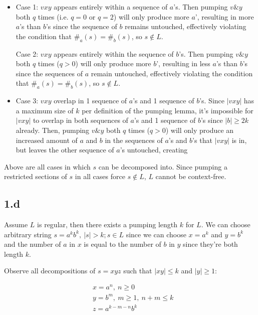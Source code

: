 \documentclass{article}
\begin{document}
\begin{itemize}

\item Case 1: $vxy$ appears entirely within a sequence of $a$'s. Then pumping $v\&y$ both $q$ times (i.e. $q=0$ or $q=2$) will only produce more $a$', resulting in more $a$'s than $b$'s since the sequence of $b$ remains untouched, effectively violating the condition that $\#_a(s) = \#_b(s)$, so $s \not \in L$.

\itme Case 2: $vxy$ appears entirely within the sequence of $b$'s. Then pumping $v\&y$ both $q$ times ($q > 0$) will only produce more $b$', resulting in less $a$'s than $b$'s since the sequences of $a$ remain untouched, effectively violating the condition that $\#_a(s) = \#_b(s)$, so $s \not \in L$.

\item Case 3: $vxy$ overlap in 1 sequence of $a$'s and 1 sequence of $b$'s. Since $|vxy|$ has a maximum size of $k$ per definition of the pumping lemma, it's impossible for $|vxy|$ to overlap in both sequences of $a$'s and 1 sequence of $b$'s since $|b| \geq 2k$ already. Then, pumping $v\&y$ both $q$ times ($q > 0$) will only produce an increased amount of $a$ and $b$ in the sequences of $a$'s and $b$'s that $|vxy|$ is in, but leaves the other sequence of $a$'s untouched, creating 

\end{itemize}

Above are all cases in which $s$ can be decomposed into. Since pumping a restricted sections of $s$ in all cases force $s \not \in L$, $L$ cannot be context-free. 

\subsection*{1.d}

Assume $L$ is regular, then there exists a pumping length $k$ for $L$. We can choose arbitrary string $s = a^kb^k, \: |s| > k; s \in L$ since we can choose $x = a^k$ and $y=b^k$ and the number of $a$ in $x$ is equal to the number of $b$ in $y$ since they're both length $k$. 

Observe all decompositions of $s = xyz$ such that $|xy| \leq k$ and $|y| \geq 1$:

\begin{align*}
&x = a^n, \: n \geq 0\\
&y = b^m, \: m \geq 1, \: n+m \leq k\\
&z = a^{k-m-n} b^k
\end{align*}
\end{document}
